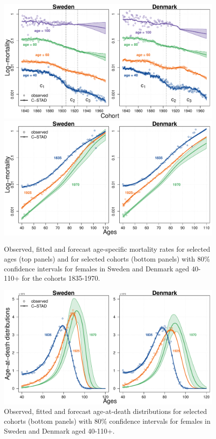 \documentclass[11pt, a4paper]{article}
\begin{document}
\begin{figure}[h!]
	\begin{center}
		\includegraphics[scale=0.57]{./Figures/F6a.pdf} 
		\includegraphics[scale=0.57]{./Figures/F6b.pdf} 
		\caption{Observed, fitted and forecast age-specific mortality rates for selected ages (top panels) and for selected cohorts (bottom panels) with 80\% confidence intervals for females in Sweden and Denmark aged 40-110+ for the cohorts 1835-1970.\label{Fig:CSTADforeMx}}    
	\end{center}
\end{figure}

\begin{figure}[h!]
	\begin{center}
		\includegraphics[scale=0.57]{./Figures/F7.pdf}  
		\caption{Observed, fitted and forecast age-at-death distributions for selected cohorts (bottom panels) with 80\% confidence intervals for females in Sweden and Denmark aged 40-110+.\label{Fig:CSTADforeDx}}    
	\end{center}
\end{figure}
\end{document}
